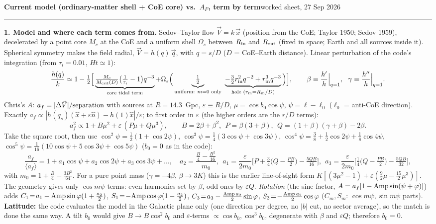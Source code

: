 \documentclass[10pt]{article}
\begin{document}
{\large\bfseries Current model (ordinary-matter shell + CoE core) vs.\ $A_F$, term by term}\hfill{\footnotesize worked sheet, 27 Sep 2026}\\[-2pt]
\rule{\textwidth}{0.4pt}
{\small
\textbf{1. Model and where each term comes from.} Sedov--Taylor flow $\vec V=k\,\vec x$ (position from the CoE; Taylor 1950; Sedov 1959), decelerated by a point core $M_c$ at the CoE and a uniform shell $\Omega_s$ between $R_{\rm in}$ and $R_{\rm out}$ (fixed in space; Earth and all sources inside it). Spherical symmetry makes the field radial, $\vec V=h(q)\,\vec q$, with $q=s/D$ ($D$ = CoE--Earth distance). Linear perturbation of the code's integration (from $\tau_i=0.01$, $H t\simeq1$):
\[
\frac{h(q)}{k}\simeq1-\tfrac12\Big[\underbrace{\tfrac{M_c}{M_{\rm crit}(D)}\big(\tfrac1{\tau_i}-1\big)q^{-3}}_{\text{core tidal term}}+\Omega_s\Big(\underbrace{\tfrac12}_{\text{uniform: }m=0\text{ only}}\ \underbrace{-\tfrac32 r_{\rm in}^2q^{-2}+r_{\rm in}^3q^{-3}}_{\text{hole }(r_{\rm in}=R_{\rm in}/D)}\Big)\Big],\qquad
\beta\equiv\frac{h'}{h}\Big|_{q=1},\ \ \gamma\equiv\frac{h''}{h}\Big|_{q=1}.
\]
Chris's $A$: $a_f=|\Delta\vec V|/{\rm separation}$ with sources at $R=14.3$~Gpc, $\varepsilon\equiv R/D$, $\mu=\cos b_0\cos\psi$, $\psi=\ell-\ell_0$ ($\ell_0$ = anti-CoE direction). Exactly $a_f\propto|h(q_s)(\hat x+\varepsilon\hat n)-h(1)\hat x|/\varepsilon$; to first order in $\varepsilon$ (the higher orders are the $r/D$ terms):
\[
a_f^2\propto1+B\mu^2+\varepsilon\,(P\mu+Q\mu^3),\qquad B=2\beta+\beta^2,\ \ P=\beta(3+\beta),\ \ Q=(1+\beta)(\gamma+\beta)-2\beta .
\]
Take the square root, then use $\cos^2\psi=\tfrac12(1+\cos2\psi)$, $\cos^3\psi=\tfrac14(3\cos\psi+\cos3\psi)$, $\cos^4\psi=\tfrac38+\tfrac12\cos2\psi+\tfrac18\cos4\psi$, $\cos^5\psi=\tfrac1{16}(10\cos\psi+5\cos3\psi+\cos5\psi)$ ($b_0=0$ as in the code):
\[
\frac{a_f}{\langle a_f\rangle}=1+a_1\cos\psi+a_2\cos2\psi+a_3\cos3\psi+\dots,\quad
a_2=\frac{\frac B4-\frac{B^2}{16}}{m_0},\ \
a_1=\frac{\varepsilon}{2m_0}\Big[P+\tfrac34\big(Q-\tfrac{PB}2\big)-\tfrac{5QB}{16}\Big],\ \
a_3=\frac{\varepsilon}{2m_0}\Big[\tfrac14\big(Q-\tfrac{PB}2\big)-\tfrac{5QB}{32}\Big],
\]
with $m_0=1+\frac B4-\frac{3B^2}{64}$. For a pure point mass ($\gamma=-4\beta$, $\beta\to3K$) this is the earlier line-of-sight form $K[(3\mu^2-1)+\varepsilon(\frac92\mu-\frac{15}2\mu^3)]$. The geometry gives only $\cos m\psi$ terms: even harmonics set by $\beta$, odd ones by $\varepsilon Q$. \emph{Rotation} (the sine factor, $A=a_f[1-{\rm Amp}\sin(\psi+\varphi)]$) adds
$C_1\!=\!a_1-{\rm Amp}\sin\varphi(1+\tfrac{a_2}2)$, $S_1\!=\!-{\rm Amp}\cos\varphi(1-\tfrac{a_2}2)$, $C_3\!=\!a_3-\tfrac{{\rm Amp}\,a_2}2\sin\varphi$, $S_3\!=\!-\tfrac{{\rm Amp}\,a_2}2\cos\varphi$ ($C_m,S_m$: $\cos m\psi,\sin m\psi$ parts).
\textbf{Latitude:} the code evaluates the model in the Galactic plane only (one direction per degree, no $|b|$ cut, no sector average), so the match is done the same way. A tilt $b_0$ would give $B\to B\cos^2b_0$ and $\varepsilon$-terms $\propto\cos b_0,\cos^3b_0$, degenerate with $\beta$ and $\varepsilon Q$; therefore $b_0=0$.

}
\end{document}
